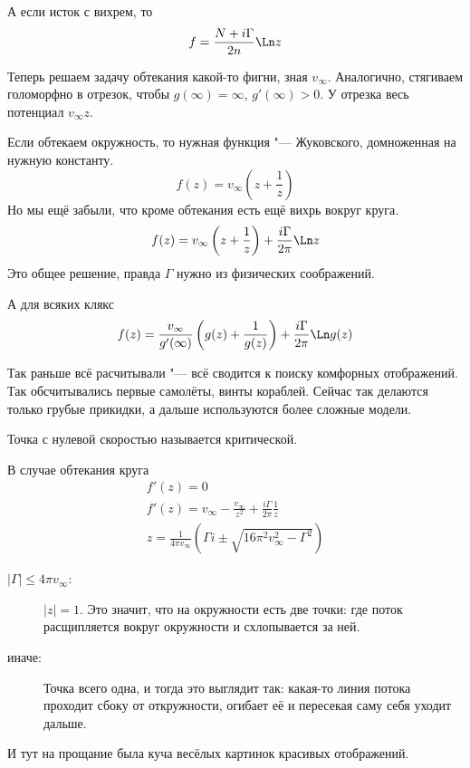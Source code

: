 А если исток с вихрем, то 
\[ f = \frac{N + i\Gamma}{2n} \Ln z \]

Теперь решаем задачу обтекания какой-то фигни, зная $v_{\infty}$.
Аналогично, стягиваем голоморфно в отрезок, чтобы $g(\infty) = \infty$, $g'(\infty) > 0$.
У отрезка весь потенциал $v_\infty z$.

Если обтекаем окружность, то нужная функция "--- Жуковского, домноженная на нужную константу.
\[ f(z) = v_{\infty} \left(z + \frac1z\right) \]
Но мы ещё забыли, что кроме обтекания есть ещё вихрь вокруг круга.
\[ f(z) = v_{\infty} \left(z + \frac1z\right) + \frac{i\Gamma}{2\pi} \Ln z \]
Это общее решение, правда $\Gamma$ нужно из физических соображений.

А для всяких клякс
\[ f(z) = \frac{v_{\infty}}{g'(\infty)} \left(g(z) + \frac1{g(z)}\right) + \frac{i\Gamma}{2\pi} \Ln g(z) \]

Так раньше всё расчитывали "--- всё сводится к поиску комфорных отображений.
Так обсчитывались первые самолёты, винты кораблей.
Сейчас так делаются только грубые прикидки, а дальше используются более сложные модели.

\begin{Def}
	Точка с нулевой скоростью называется критической.
\end{Def}

В случае обтекания круга
\begin{gather*}
	f'(z) = 0 \\
	f'(z) = v_{\infty} - \frac{v_{\infty}}{z^2} + \frac{i\Gamma}{2\pi}\frac1z \\
	z = \frac1{4\pi v_{\infty}} \left( \Gamma i \pm \sqrt{16\pi^2 v_{\infty}^2 - \Gamma^2} \right)
\end{gather*}
\begin{description}
\item[$|\Gamma| \le 4\pi v_{\infty}$:]
	$|z| = 1$.
	Это значит, что на окружности есть две точки: где поток расщипляется вокруг окружности и схлопывается за ней.

\item[иначе:]
	Точка всего одна, и тогда это выглядит так:
	какая-то линия потока проходит сбоку от откружности, огибает её и пересекая саму себя уходит дальше.
\end{description}

И тут на прощание была куча весёлых картинок красивых отображений.
